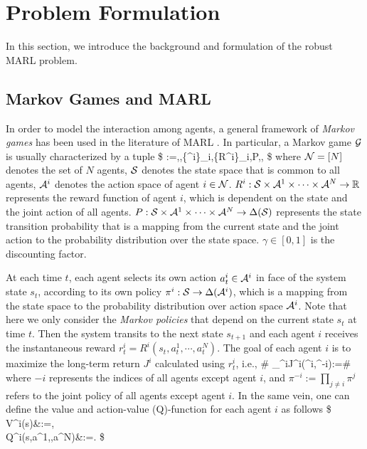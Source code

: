 


\section{Problem Formulation}\label{sec:background}

In this section, we introduce the background and formulation of the robust MARL problem. 


\subsection{Markov Games and MARL}\label{sec:MARL_form} 
In order to model the interaction among agents, a general framework of \emph{Markov games} has been used  in the literature of MARL \citep{littman1994markov}. 
In particular, a Markov game $\mathcal{G}$ is usually characterized by a tuple 
\$
\cG:=\la\cN,\cS,\{\cA^i\}_{i\in\cN},\{R^i\}_{i\in\cN},P,\gamma\ra,
\$
 where $\mathcal{N}=[N]$ denotes the set of $N$ agents, ${\mathcal{S}}$ denotes the state space that is common to all agents, $\mathcal{A}^i$ denotes the action space of agent $i\in\mathcal{N}$. $R^i:{\mathcal{S}}\times\mathcal{A}^1\times\cdots\times\mathcal{A}^N\to \mathbb{R}$ represents the reward function of agent $i$, which is dependent on the state and the joint action of all agents.   $P:{\mathcal{S}}\times\mathcal{A}^1\times\cdots\times\mathcal{A}^N\to\Delta({\mathcal{S}})$ represents the state transition probability that is a mapping from the current state and the joint action to the probability distribution over the state space.  $\gamma\in[0,1]$ is the discounting factor. 
 
 
At each time $t$, 
each agent  selects its own action $a^i_t\in\mathcal{A}^i$ in face of the  system state $s_t$, according to its own policy $\pi^i:{\mathcal{S}}\to \Delta(\mathcal{A}^i)$, which is a mapping from the state space to the probability distribution over action space $\mathcal{A}^i$.
Note that here we only consider the \emph{Markov policies} that depend on the current state $s_t$ at time $t$. 
 Then the system transits to the next state $s_{t+1}$ and each agent $i$ receives the instantaneous reward $r^i_t=R^i(s_t,a^1_t,\cdots,a^N_t)$. The goal of each agent $i$ is to maximize the long-term return $J^i$ calculated using $r^i_t$, i.e., 
\#\label{equ:def_return_i} 
\max_{\pi^i}\quad J^i(\pi^i,\pi^{-i}):=\EE\bigg[\sum_{t=0}^\infty \gamma^tr^i_t\bigggiven s_0,a^i_t\sim\pi^i(\cdot\given s_t)\bigg]
\#
where  $-i$ represents the indices of all agents except agent $i$, and 
$\pi^{-i}:=\prod_{j\neq i}\pi^j$ refers to the joint policy of all agents except agent $i$. 
In the same vein, one can define the value and action-value (Q)-function for each agent $i$ as follows 
\$
V^i(s)&:=\EE\bigg[\sum_{t=0}^\infty \gamma^tr^i_t\bigggiven s_0=s,a^i_t\sim\pi^i(\cdot\given s_t)\bigg], \\ Q^i(s,a^1,\cdots,a^N)&:=\EE\bigg[\sum_{t=0}^\infty \gamma^tr^i_t\bigggiven s_0=s,a^i_0=a^i,a^i_t\sim\pi^i(\cdot\given s_t)\bigg]. 
\$ 




